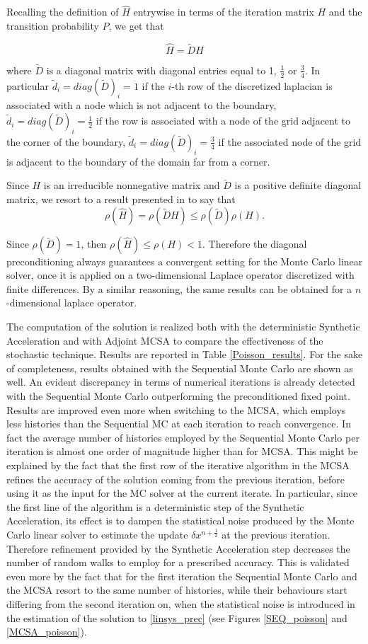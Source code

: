 Recalling the definition of $\hat{H}$ entrywise in terms of the
iteration matrix $H$ and the transition probability $P$, we get that

\[
 \hat{H}=\tilde{D}H
\]

where $\tilde{D}$ is a diagonal matrix with diagonal entries equal to
1, $\frac{1}{2}$ or $\frac{3}{4}$.
In particular $\tilde{d}_i=diag(\tilde D)_i=1$ if the $i$-th row of the
discretized laplacian is associated with a node which is not adjacent to the
boundary, $\tilde{d}_i=diag(\tilde D)_i=\frac{1}{2}$ if the row is associated
with a node of the grid adjacent to the corner of the boundary,
$\tilde{d}_i=diag(\tilde D)_i=\frac{3}{4}$ if the associated node of the grid
is adjacent to the boundary of the domain far from a corner.

Since $H$ is an irreducible nonnegative matrix and $\tilde{D}$ is a
positive definite diagonal matrix, we resort to a result presented in
\cite{FK1975} to say that
\[
 \rho(\hat{H})=\rho(\tilde{D}H)\le \rho(\tilde D)\rho(H).
\]

Since $\rho(\tilde{D})=1$, then $\rho(\hat{H})\le \rho(H)<1$.
Therefore the diagonal preconditioning always guarantees a convergent
setting for the Monte Carlo linear solver, once it is applied on a
two-dimensional Laplace
operator discretized with finite differences. By a similar reasoning, the same
results can be obtained for a $n$-dimensional laplace operator.


The computation of the solution is realized both with the deterministic
Synthetic Acceleration and with Adjoint MCSA to compare the effectiveness of
the
stochastic technique. Results are reported in Table
\ref{Poisson_results}. For the sake of completeness, results obtained with
the Sequential Monte Carlo are shown as well. An evident discrepancy in terms
of numerical iterations
is already detected with the Sequential Monte Carlo outperforming the
preconditioned fixed point. Results are improved even more
when
switching to the MCSA, which employs less histories than the Sequential MC at
each iteration to
reach convergence. In fact the average number of histories employed by the
Sequential
Monte Carlo per iteration is almost one order of magnitude higher than for
MCSA. This
might be explained by the fact that the first row of the iterative algorithm in
the MCSA refines the accuracy of the solution coming from the previous
iteration,
before using it as the input for the MC solver at the current iterate.
In particular, since the first line of the algorithm is a deterministic step of
the Synthetic Acceleration, its effect is to dampen the statistical noise
produced by the Monte Carlo linear solver to estimate the update $\delta
x^{n + \frac{1}{2}}$ at the previous iteration. Therefore
refinement provided by the Synthetic Acceleration step decreases the number of
random walks
to employ for a prescribed accuracy. This is validated even more by the fact
that for the first iteration the Sequential Monte Carlo and the MCSA resort to
the same number of histories, while their behaviours start differing from the
second iteration on, when the statistical noise is introduced in the estimation
of the solution to \ref{linsys_prec} (see Figures \ref{SEQ_poisson} and
\ref{MCSA_poisson}).


